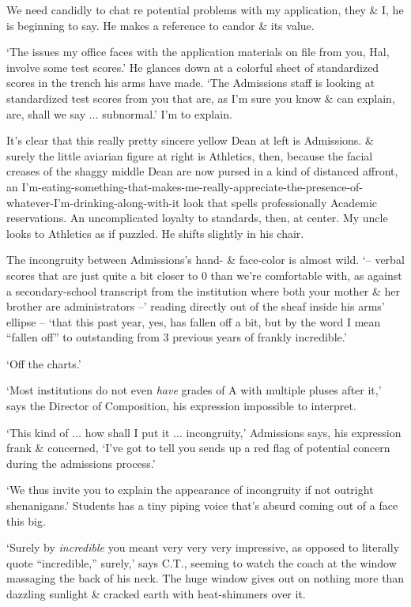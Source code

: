 \documentclass{article}
\numberwithin{equation}{section}
\begin{document}
We need candidly to chat re potential problems with my application, they \& I, he is beginning to say. He makes a reference to candor \& its value.

`The issues my office faces with the application materials on file from you, Hal, involve some test scores.' He glances down at a colorful sheet of standardized scores in the trench his arms have made. `The Admissions staff is looking at standardized test scores from you that are, as I'm sure you know \& can explain, are, shall we say $\ldots$ subnormal.' I'm to explain.

It's clear that this really pretty sincere yellow Dean at left is Admissions. \& surely the little aviarian figure at right is Athletics, then, because the facial creases of the shaggy middle Dean are now pursed in a kind of distanced affront, an I'm-eating-something-that-makes-me-really-appreciate-the-presence-of-whatever-I'm-drinking-along-with-it look that spells professionally Academic reservations. An uncomplicated loyalty to standards, then, at center. My uncle looks to Athletics as if puzzled. He shifts slightly in his chair.

The incongruity between Admissions's hand- \& face-color is almost wild. `-- verbal scores that are just quite a bit closer to 0 than we're comfortable with, as against a secondary-school transcript from the institution where both your mother \& her brother are administrators --' reading directly out of the sheaf inside his arms' ellipse -- `that this past year, yes, has fallen off a bit, but by the word I mean ``fallen off'' to outstanding from 3 previous years of frankly incredible.'

`Off the charts.'

`Most institutions do not even \textit{have} grades of A with multiple pluses after it,' says the Director of Composition, his expression impossible to interpret.

`This kind of $\ldots$ how shall I put it $\ldots$ incongruity,' Admissions says, his expression frank \& concerned, `I've got to tell you sends up a red flag of potential concern during the admissions process.'

`We thus invite you to explain the appearance of incongruity if not outright shenanigans.' Students has a tiny piping voice that's absurd coming out of a face this big.

`Surely by \textit{incredible} you meant very very very impressive, as opposed to literally quote ``incredible,'' surely,' says C.T., seeming to watch the coach at the window massaging the back of his neck. The huge window gives out on nothing more than dazzling sunlight \& cracked earth with heat-shimmers over it.
\end{document}
